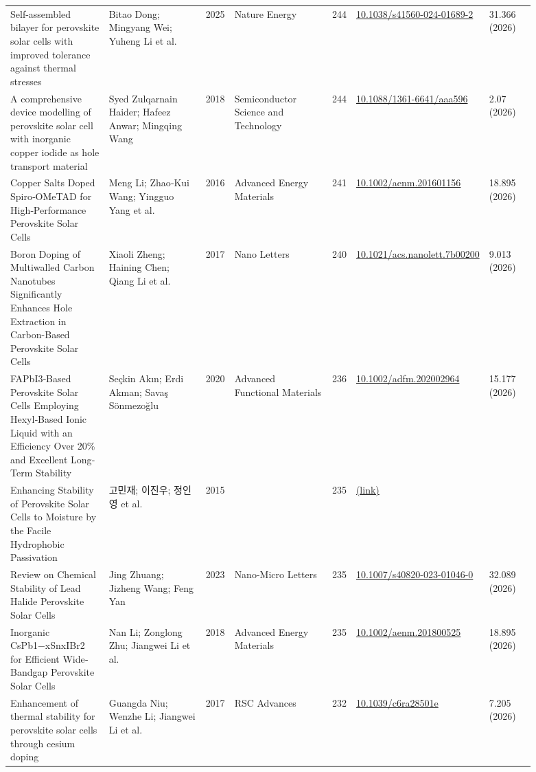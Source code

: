 \documentclass[10pt,a4paper]{article}
\begin{document}
{\begin{longtable}{p{0.197\linewidth}p{0.197\linewidth}p{0.043\linewidth}p{0.197\linewidth}p{0.043\linewidth}p{0.117\linewidth}p{0.098\linewidth}}
Self-assembled bilayer for perovskite solar cells with improved tolerance against thermal stresses & Bitao Dong; Mingyang Wei; Yuheng Li et al. & 2025 & Nature Energy & 244 & \href{https://doi.org/10.1038/s41560-024-01689-2}{10.1038/s41560-024-01689-2} & 31.366 (2026) \\
A comprehensive device modelling of perovskite solar cell with inorganic copper iodide as hole transport material & Syed Zulqarnain Haider; Hafeez Anwar; Mingqing Wang & 2018 & Semiconductor Science and Technology & 244 & \href{https://doi.org/10.1088/1361-6641/aaa596}{10.1088/1361-6641/aaa596} & 2.07 (2026) \\
Copper Salts Doped Spiro‐OMeTAD for High‐Performance Perovskite Solar Cells & Meng Li; Zhao‐Kui Wang; Yingguo Yang et al. & 2016 & Advanced Energy Materials & 241 & \href{https://doi.org/10.1002/aenm.201601156}{10.1002/aenm.201601156} & 18.895 (2026) \\
Boron Doping of Multiwalled Carbon Nanotubes Significantly Enhances Hole Extraction in Carbon-Based Perovskite Solar Cells & Xiaoli Zheng; Haining Chen; Qiang Li et al. & 2017 & Nano Letters & 240 & \href{https://doi.org/10.1021/acs.nanolett.7b00200}{10.1021/acs.nanolett.7b00200} & 9.013 (2026) \\
FAPbI3‐Based Perovskite Solar Cells Employing Hexyl‐Based Ionic Liquid with an Efficiency Over 20\% and Excellent Long‐Term Stability & Seçkin Akın; Erdi Akman; Savaş Sönmezoğlu & 2020 & Advanced Functional Materials & 236 & \href{https://doi.org/10.1002/adfm.202002964}{10.1002/adfm.202002964} & 15.177 (2026) \\
Enhancing Stability of Perovskite Solar Cells to Moisture by the Facile Hydrophobic Passivation & 고민재; 이진우; 정인영 et al. & 2015 &  & 235 & \href{https://openalex.org/W3029134055}{(link)} &  \\
Review on Chemical Stability of Lead Halide Perovskite Solar Cells & Jing Zhuang; Jizheng Wang; Feng Yan & 2023 & Nano-Micro Letters & 235 & \href{https://doi.org/10.1007/s40820-023-01046-0}{10.1007/s40820-023-01046-0} & 32.089 (2026) \\
Inorganic CsPb1−xSnxIBr2 for Efficient Wide‐Bandgap Perovskite Solar Cells & Nan Li; Zonglong Zhu; Jiangwei Li et al. & 2018 & Advanced Energy Materials & 235 & \href{https://doi.org/10.1002/aenm.201800525}{10.1002/aenm.201800525} & 18.895 (2026) \\
Enhancement of thermal stability for perovskite solar cells through cesium doping & Guangda Niu; Wenzhe Li; Jiangwei Li et al. & 2017 & RSC Advances & 232 & \href{https://doi.org/10.1039/c6ra28501e}{10.1039/c6ra28501e} & 7.205 (2026) \\

\end{longtable}}
\end{document}
